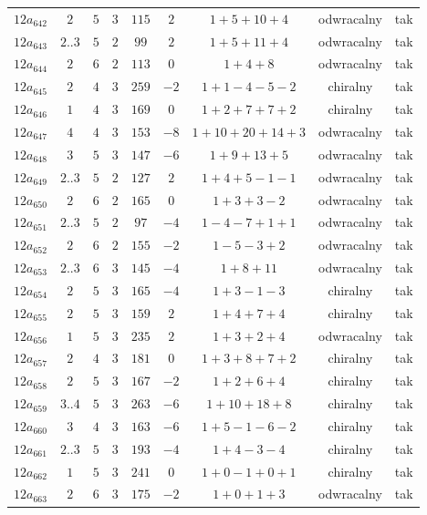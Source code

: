 \begin{longtable}{ccccccccc}
$12a_{642}$ & $2$ & $5$ & $3$ & $115$ & $2$ & $1+5+10+4$ & odwracalny & tak \\
$12a_{643}$ & $2..3$ & $5$ & $2$ & $99$ & $2$ & $1+5+11+4$ & odwracalny & tak \\
$12a_{644}$ & $2$ & $6$ & $2$ & $113$ & $0$ & $1+4+8$ & odwracalny & tak \\
$12a_{645}$ & $2$ & $4$ & $3$ & $259$ & $-2$ & $1+1-4-5-2$ & chiralny & tak \\
$12a_{646}$ & $1$ & $4$ & $3$ & $169$ & $0$ & $1+2+7+7+2$ & chiralny & tak \\
$12a_{647}$ & $4$ & $4$ & $3$ & $153$ & $-8$ & $1+10+20+14+3$ & odwracalny & tak \\
$12a_{648}$ & $3$ & $5$ & $3$ & $147$ & $-6$ & $1+9+13+5$ & odwracalny & tak \\
$12a_{649}$ & $2..3$ & $5$ & $2$ & $127$ & $2$ & $1+4+5-1-1$ & odwracalny & tak \\
$12a_{650}$ & $2$ & $6$ & $2$ & $165$ & $0$ & $1+3+3-2$ & odwracalny & tak \\
$12a_{651}$ & $2..3$ & $5$ & $2$ & $97$ & $-4$ & $1-4-7+1+1$ & odwracalny & tak \\
$12a_{652}$ & $2$ & $6$ & $2$ & $155$ & $-2$ & $1-5-3+2$ & odwracalny & tak \\
$12a_{653}$ & $2..3$ & $6$ & $3$ & $145$ & $-4$ & $1+8+11$ & odwracalny & tak \\
$12a_{654}$ & $2$ & $5$ & $3$ & $165$ & $-4$ & $1+3-1-3$ & chiralny & tak \\
$12a_{655}$ & $2$ & $5$ & $3$ & $159$ & $2$ & $1+4+7+4$ & chiralny & tak \\
$12a_{656}$ & $1$ & $5$ & $3$ & $235$ & $2$ & $1+3+2+4$ & odwracalny & tak \\
$12a_{657}$ & $2$ & $4$ & $3$ & $181$ & $0$ & $1+3+8+7+2$ & chiralny & tak \\
$12a_{658}$ & $2$ & $5$ & $3$ & $167$ & $-2$ & $1+2+6+4$ & chiralny & tak \\
$12a_{659}$ & $3..4$ & $5$ & $3$ & $263$ & $-6$ & $1+10+18+8$ & chiralny & tak \\
$12a_{660}$ & $3$ & $4$ & $3$ & $163$ & $-6$ & $1+5-1-6-2$ & chiralny & tak \\
$12a_{661}$ & $2..3$ & $5$ & $3$ & $193$ & $-4$ & $1+4-3-4$ & chiralny & tak \\
$12a_{662}$ & $1$ & $5$ & $3$ & $241$ & $0$ & $1+0-1+0+1$ & chiralny & tak \\
$12a_{663}$ & $2$ & $6$ & $3$ & $175$ & $-2$ & $1+0+1+3$ & odwracalny & tak \\

\end{longtable}
